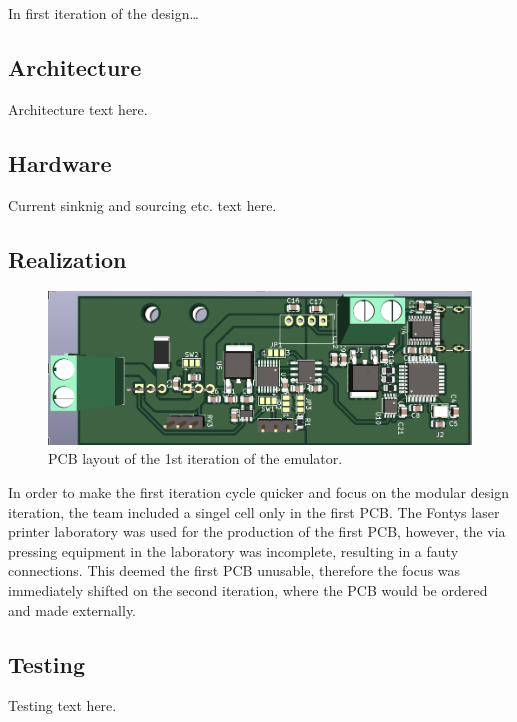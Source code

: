 
\IEEEPARstart
{I}{n} first iteration of the design\dots

\subsection{Architecture}
Architecture text here.
\subsection{Hardware}
Current sinknig and sourcing etc. text here.
\subsection{Realization}
    \begin{figure}[h]
        \centering
        \includegraphics[scale=0.45]{pcb_1st_iteration.png}
        \caption{PCB layout of the 1st iteration of the emulator.}
    \end{figure}


In order to make the first iteration cycle quicker and focus on the modular design 
iteration, the team included a singel cell only in the first PCB. The Fontys laser
printer laboratory was used for the production of the first PCB, however, the via pressing
equipment in the laboratory was incomplete, resulting in a fauty connections. This 
deemed the first PCB unusable, therefore the focus was immediately shifted on the 
second iteration, where the PCB would be ordered and made externally.

\subsection{Testing}
Testing text here.